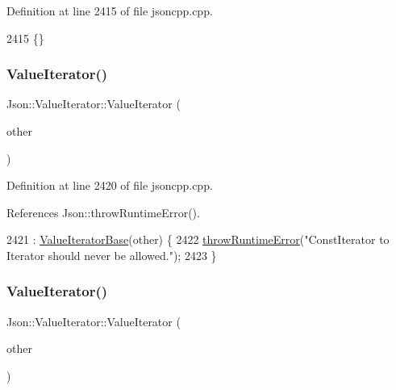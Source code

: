 Definition at line 2415 of file jsoncpp.\+cpp.


\begin{DoxyCode}
2415 \{\}
\end{DoxyCode}
\mbox{\label{class_json_1_1_value_iterator_aa85aa208670891670392259efa0143bb}} 
\subsubsection{\texorpdfstring{Value\+Iterator()}{ValueIterator()}\hspace{0.1cm}{\footnotesize\ttfamily [2/4]}}
{\footnotesize\ttfamily Json\+::\+Value\+Iterator\+::\+Value\+Iterator (\begin{DoxyParamCaption}\item[{const \hyperlink{class_json_1_1_value_const_iterator}{Value\+Const\+Iterator} \&}]{other }\end{DoxyParamCaption})\hspace{0.3cm}{\ttfamily [explicit]}}



Definition at line 2420 of file jsoncpp.\+cpp.



References Json\+::throw\+Runtime\+Error().


\begin{DoxyCode}
2421     : \hyperlink{class_json_1_1_value_iterator_base_af45b028d9ff9cbd2554a87878b42dd75}{ValueIteratorBase}(other) \{
2422   \hyperlink{namespace_json_a0ab7ff7f99788262d92d9ff3d924e065}{throwRuntimeError}(\textcolor{stringliteral}{"ConstIterator to Iterator should never be allowed."});
2423 \}
\end{DoxyCode}
\mbox{\label{class_json_1_1_value_iterator_a7d5e58a9a4a553968acdf3064b39d21c}} 
\subsubsection{\texorpdfstring{Value\+Iterator()}{ValueIterator()}\hspace{0.1cm}{\footnotesize\ttfamily [3/4]}}
{\footnotesize\ttfamily Json\+::\+Value\+Iterator\+::\+Value\+Iterator (\begin{DoxyParamCaption}\item[{const \hyperlink{class_json_1_1_value_iterator}{Value\+Iterator} \&}]{other }\end{DoxyParamCaption})}



